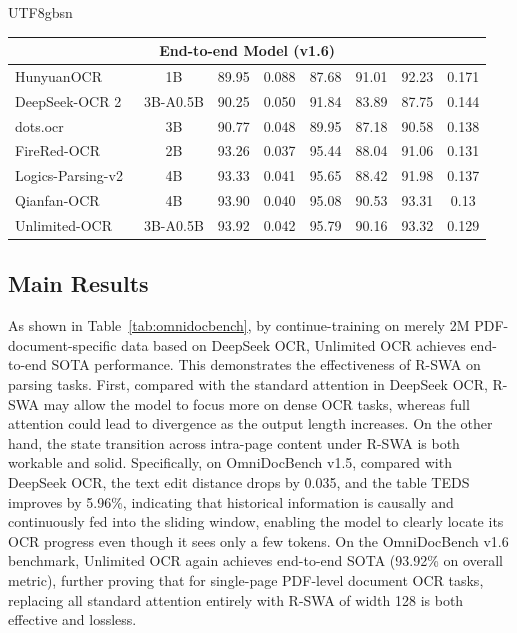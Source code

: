 \documentclass[11pt, a4paper, logo, copyright, nonumbering]{deepseek}
\begin{document}
\begin{CJK*}{UTF8}{gbsn}
\begin{table}[h]
{\begin{tabular}{l|c|c|ccccc}
\midrule  
\multicolumn{8}{c}{\textbf{    End-to-end Model (v1.6)}} \\ 
\midrule  
HunyuanOCR~\cite{team2025hunyuanocr}&1B & 89.95  & 0.088  & 87.68  & 91.01  & 92.23 &  0.171 \\ 
DeepSeek-OCR 2~\cite{wei2026deepseek}&3B-A0.5B & 90.25  & 0.050  & 91.84  & 83.89  & 87.75 &  0.144 \\ 
dots.ocr~\cite{dots}&3B & 90.77 & 0.048 & 89.95 & 87.18 & 90.58 & 0.138 \\ 
FireRed-OCR~\cite{wu2026firered}&2B & 93.26 & 0.037  & 95.44  & 88.04  & 91.06 &  0.131 \\ 
Logics-Parsing-v2~\cite{Logics-Parsing-V2}&4B & 93.33  & 0.041  & 95.65  & 88.42  & 91.98 &  0.137 \\ 
Qianfan-OCR~\cite{dong2026qianfan}&4B & 93.90  & 0.040  & 95.08  & 90.53  & 93.31 &  0.13 \\ 
\midrule 
\rowcolor{gray!10}
Unlimited-OCR &3B-A0.5B & 93.92 & 0.042 & 95.79 & 90.16 & 93.32 & 0.129 \\ 
\bottomrule[.9pt]
\end{tabular}
}
\end{table}




\subsection{Main Results}
\label{OmniDocbench v1.5}

As shown in Table~\ref{tab:omnidocbench}, by continue-training on merely 2M PDF-document-specific data based on DeepSeek OCR, Unlimited OCR achieves end-to-end SOTA performance. This demonstrates the effectiveness of R-SWA on parsing tasks. First, compared with the standard attention in DeepSeek OCR, R-SWA may allow the model to focus more on dense OCR tasks, whereas full attention could lead to divergence as the output length increases. On the other hand, the state transition across intra-page content under R-SWA is both workable and solid. Specifically, on OmniDocBench v1.5, compared with DeepSeek OCR, the text edit distance drops by 0.035, and the table TEDS improves by 5.96\%, indicating that historical information is causally and continuously fed into the sliding window, enabling the model to clearly locate its OCR progress even though it sees only a few tokens. On the OmniDocBench v1.6 benchmark, Unlimited OCR again achieves end-to-end SOTA (93.92\% on overall metric), further proving that for single-page PDF-level document OCR tasks, replacing all standard attention entirely with R-SWA of width 128 is both effective and lossless.


\end{CJK*}
\end{document}
